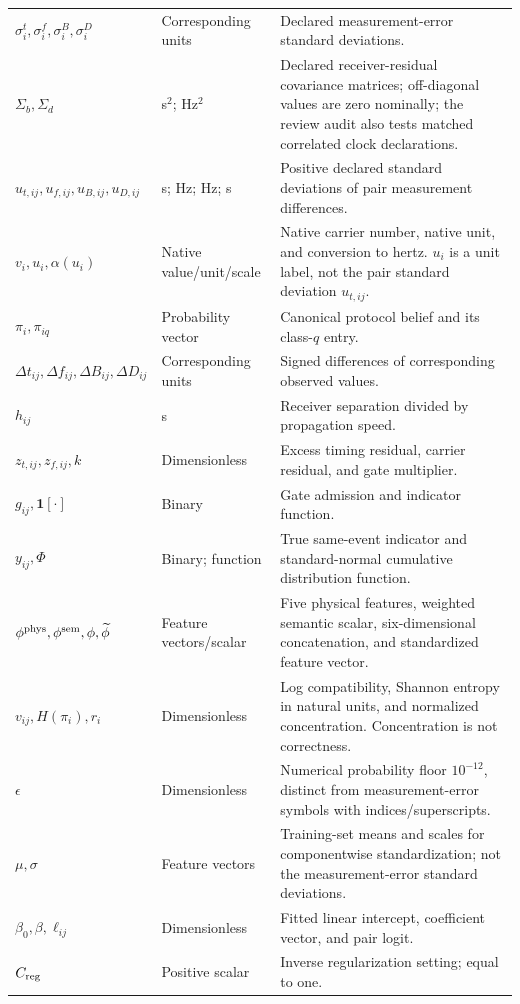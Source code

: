\documentclass[10pt,a4paper]{article}
\newcommand{\ind}{\mathbf{1}}\newcommand{\R}{\mathbb R}
\begin{document}
\begin{longtable}{@{}>{\raggedright\arraybackslash}p{3.0cm}>{\raggedright\arraybackslash}p{2.5cm}>{\raggedright\arraybackslash}p{10.5cm}@{}}
$\sigma_i^t,\sigma_i^f,\sigma_i^B,\sigma_i^D$ & Corresponding units & Declared measurement-error standard deviations. \\
$\Sigma_b,\Sigma_d$ & s$^2$; Hz$^2$ & Declared receiver-residual covariance matrices; off-diagonal values are zero nominally; the review audit also tests matched correlated clock declarations. \\
$u_{t,ij},u_{f,ij},u_{B,ij},u_{D,ij}$ & s; Hz; Hz; s & Positive declared standard deviations of pair measurement differences. \\
$v_i,u_i,\alpha(u_i)$ & Native value/unit/scale & Native carrier number, native unit, and conversion to hertz. $u_i$ is a unit label, not the pair standard deviation $u_{t,ij}$. \\
$\pi_i,\pi_{iq}$ & Probability vector & Canonical protocol belief and its class-$q$ entry. \\
$\Delta t_{ij},\Delta f_{ij},\Delta B_{ij},\Delta D_{ij}$ & Corresponding units & Signed differences of corresponding observed values. \\
$h_{ij}$ & s & Receiver separation divided by propagation speed. \\
$z_{t,ij},z_{f,ij},k$ & Dimensionless & Excess timing residual, carrier residual, and gate multiplier. \\
$g_{ij},\ind[\cdot]$ & Binary & Gate admission and indicator function. \\
$y_{ij},\Phi$ & Binary; function & True same-event indicator and standard-normal cumulative distribution function. \\
$\phi^{\rm phys},\phi^{\rm sem},\phi,\widetilde\phi$ & Feature vectors/scalar & Five physical features, weighted semantic scalar, six-dimensional concatenation, and standardized feature vector. \\
$v_{ij},H(\pi_i),r_i$ & Dimensionless & Log compatibility, Shannon entropy in natural units, and normalized concentration. Concentration is not correctness. \\
$\epsilon$ & Dimensionless & Numerical probability floor $10^{-12}$, distinct from measurement-error symbols with indices/superscripts. \\
$\mu,\sigma$ & Feature vectors & Training-set means and scales for componentwise standardization; not the measurement-error standard deviations. \\
$\beta_0,\beta,\ell_{ij}$ & Dimensionless & Fitted linear intercept, coefficient vector, and pair logit. \\
$C_{\rm reg}$ & Positive scalar & Inverse regularization setting; equal to one. \\

\end{longtable}
\end{document}
